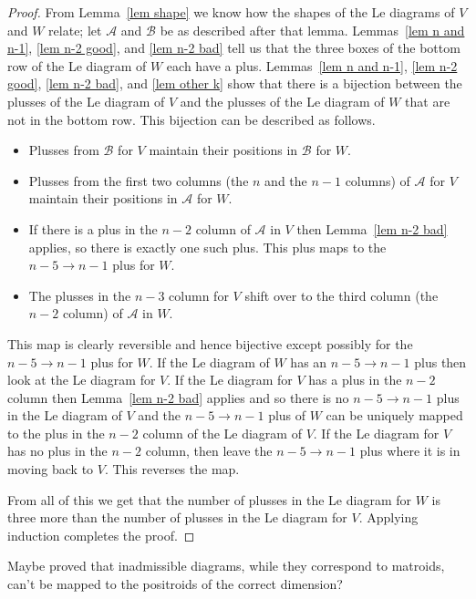 \documentclass[11pt]{article}
\theoremstyle{remark}
\theoremstyle{definition}
\begin{document}
\begin{proof}
  {}From Lemma~\ref{lem shape} we know how the shapes of the Le diagrams of $V$ and $W$ relate; let $\mathcal{A}$ and $\mathcal{B}$ be as described after that lemma.  Lemmas~\ref{lem n and n-1}, \ref{lem n-2 good}, and \ref{lem n-2 bad} tell us that the three boxes of the bottom row of the Le diagram of $W$ each have a plus.  Lemmas~\ref{lem n and n-1}, \ref{lem n-2 good}, \ref{lem n-2 bad}, and \ref{lem other k} show that there is a bijection between the plusses of the Le diagram of $V$ and the plusses of the Le diagram of $W$ that are not in the bottom row.  This bijection can be described as follows.
  \begin{itemize}
  \item Plusses from $\mathcal{B}$ for $V$ maintain their positions in $\mathcal{B}$ for $W$.
  \item Plusses from the first two columns (the $n$ and the $n-1$ columns) of $\mathcal{A}$ for $V$ maintain their positions in $\mathcal{A}$ for $W$.
  \item If there is a plus in the $n-2$ column of $\mathcal{A}$ in $V$ then Lemma~\ref{lem n-2 bad} applies, so there is exactly one such plus.  This plus maps to the $n-5\rightarrow n-1$ plus for $W$.
  \item The plusses in the $n-3$ column for $V$ shift over to the third column (the $n-2$ column) of $\mathcal{A}$ in $W$.
  \end{itemize}
  This map is clearly reversible and hence bijective except possibly for the $n-5\rightarrow n-1$ plus for $W$.   If the Le diagram of $W$ has an $n-5\rightarrow n-1$ plus then look at the Le diagram for $V$.  If the Le diagram for $V$ has a plus in the $n-2$ column then Lemma~\ref{lem n-2 bad} applies and so there is no $n-5\rightarrow n-1$ plus in the Le diagram of $V$ and the $n-5\rightarrow n-1$ plus of $W$ can be uniquely mapped to the plus in the $n-2$ column of the Le diagram of $V$.  If the Le diagram for $V$ has no plus in the $n-2$ column, then leave the $n-5\rightarrow n-1$ plus where it is in moving back to $V$.  This reverses the map.

  From all of this we get that the number of plusses in the Le diagram for $W$ is three more than the number of plusses in the Le diagram for $V$.  Applying induction completes the proof.
\end{proof}


{\color{red}Maybe proved that inadmissible diagrams, while they correspond to matroids, can't be mapped to the positroids of the correct dimension? }
\end{document}
